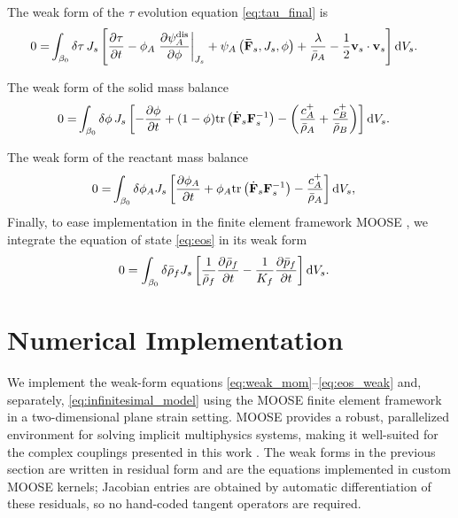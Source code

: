 \documentclass[11pt]{article}
\begin{document}
The weak form of the $\tau$ evolution equation \eqref{eq:tau_final} is
%
\begin{align}
  0 =& \int_{\beta_0} \delta \tau \, J_s \left[ \frac{\partial \tau}{\partial t} - \phi_A \left.\frac{\partial \psi^\text{dis}_A}{\partial \phi}\right\vert_{J_s} + \psi_A\left(\mathbf{\bar{F}}_s, J_s, \phi\right) + \frac{\lambda}{\bar{\rho}_A} - \frac{1}{2} \mathbf{v}_s \cdot \mathbf{v}_s \right] {\rm d}V_s.
\end{align}
%

The weak form of the solid mass balance
\begin{align}
  0 =& \int_{\beta_0}  \delta \phi \, J_s \left[ -\frac{\partial \phi}{\partial t} + (1 - \phi) \mbox{tr} \left( \dot{\mathbf{F}}_s \mathbf{F}_s^{-1} \right)  - \left( \frac{c_A^+}{\bar{\rho}_A} + \frac{c_B^+}{\bar{\rho}_B} \right)\right]  {\rm d}V_s.
\end{align}

The weak form of the reactant mass balance
%
\begin{align}
  0 =& \int_{\beta_0} \delta \phi_A J_s \left[ \frac{\partial \phi_A}{\partial t} + \phi_A \mbox{tr} \left( \dot{\mathbf{F}}_s  \mathbf{F}_s^{-1} \right) - \frac{c_A^+}{\bar{\rho}_A} \right] {\rm d}V_s,
\end{align}
%
Finally, to ease implementation in the finite element framework MOOSE \cite{harbour2025moose}, we integrate the equation of state \eqref{eq:eos} in its weak form
%
\begin{align}
  0 &= \int_{\beta_0} \delta \bar{\rho}_f J_s \left[\frac{1}{\bar\rho_f} \frac{\partial \bar\rho_f}{\partial t} - \frac{1}{K_f}\frac{\partial \bar{p}_f}{\partial t}\right] {\rm d}V_s. \label{eq:eos_weak}
\end{align}

\section{Numerical Implementation}
\label{sec:implementation}

We implement the weak-form equations \eqref{eq:weak_mom}--\eqref{eq:eos_weak} and, separately, \eqref{eq:infinitesimal_model} using the MOOSE finite element framework in a two-dimensional plane strain setting. MOOSE provides a robust, parallelized environment for solving implicit multiphysics systems, making it well-suited for the complex couplings presented in this work \cite{harbour2025moose}. The weak forms in the previous section are written in residual form and are the equations implemented in custom MOOSE kernels; Jacobian entries are obtained by automatic differentiation of these residuals, so no hand-coded tangent operators are required.
\end{document}
